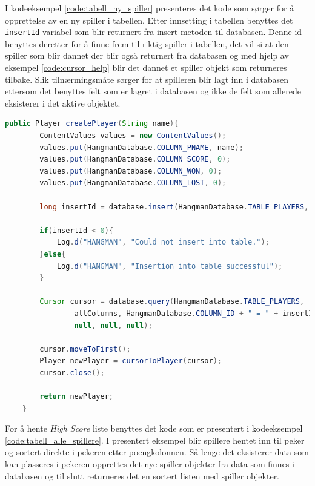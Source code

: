 I kodeeksempel \ref{code:tabell_ny_spiller} presenteres det kode som sørger for å opprettelse av en ny spiller i tabellen. Etter innsetting i tabellen benyttes det \texttt{insertId} variabel som blir returnert fra insert metoden til databasen. Denne id benyttes deretter for å finne frem til riktig spiller i tabellen, det vil si at den spiller som blir dannet der blir også returnert fra databasen og med hjelp av eksempel \ref{code:cursor_help} blir det dannet et spiller objekt som returneres tilbake. Slik tilnærmingsmåte sørger for at spilleren blir lagt inn i databasen ettersom det benyttes felt som er lagret i databasen og ikke de felt som allerede eksisterer i det aktive objektet.

\begin{lstlisting}[language=Java, caption=Metode for oppretting av en ny spiller i tabellen, label=code:tabell_ny_spiller]
public Player createPlayer(String name){
        ContentValues values = new ContentValues();
        values.put(HangmanDatabase.COLUMN_PNAME, name);
        values.put(HangmanDatabase.COLUMN_SCORE, 0);
        values.put(HangmanDatabase.COLUMN_WON, 0);
        values.put(HangmanDatabase.COLUMN_LOST, 0);

        long insertId = database.insert(HangmanDatabase.TABLE_PLAYERS, null, values);

        if(insertId < 0){
            Log.d("HANGMAN", "Could not insert into table.");
        }else{
            Log.d("HANGMAN", "Insertion into table successful");
        }

        Cursor cursor = database.query(HangmanDatabase.TABLE_PLAYERS,
                allColumns, HangmanDatabase.COLUMN_ID + " = " + insertId, null,
                null, null, null);

        cursor.moveToFirst();
        Player newPlayer = cursorToPlayer(cursor);
        cursor.close();

        return newPlayer;
    }
\end{lstlisting}

For å hente \textit{High Score} liste benyttes det kode som er presentert i kodeeksempel \ref{code:tabell_alle_spillere}. I presentert eksempel blir spillere hentet inn til peker og sortert direkte i pekeren etter poengkolonnen. Så lenge det eksisterer data som kan plasseres i pekeren opprettes det nye spiller objekter fra data som finnes i databasen og til slutt returneres det en sortert listen med spiller objekter.

